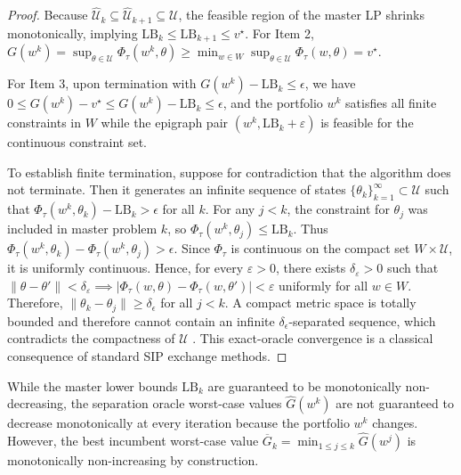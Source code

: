 \documentclass[smallcondensed]{svjour3}
\begin{document}
\begin{proof}
Because $\widehat{\mathcal{U}}_k \subseteq \widehat{\mathcal{U}}_{k+1} \subseteq \mathcal{U}$, the feasible region of the master LP shrinks monotonically, implying $\mathrm{LB}_k \le \mathrm{LB}_{k+1} \le v^\star$. For Item 2, $G(w^k) = \sup_{\theta \in \mathcal{U}} \Phi_\tau(w^k, \theta) \ge \min_{w \in W} \sup_{\theta \in \mathcal{U}} \Phi_\tau(w, \theta) = v^\star$.

For Item 3, upon termination with $G(w^k) - \mathrm{LB}_k \le \epsilon$, we have $0 \le G(w^k) - v^\star \le G(w^k) - \mathrm{LB}_k \le \epsilon$, and the portfolio $w^k$ satisfies all finite constraints in $W$ while the epigraph pair $(w^k, \mathrm{LB}_k+\varepsilon)$ is feasible for the continuous constraint set.

To establish finite termination, suppose for contradiction that the algorithm does not terminate. Then it generates an infinite sequence of states $\{\theta_k\}_{k=1}^\infty \subset \mathcal{U}$ such that $\Phi_\tau(w^k, \theta_k) - \mathrm{LB}_k > \epsilon$ for all $k$. For any $j < k$, the constraint for $\theta_j$ was included in master problem $k$, so $\Phi_\tau(w^k, \theta_j) \le \mathrm{LB}_k$. Thus $\Phi_\tau(w^k, \theta_k) - \Phi_\tau(w^k, \theta_j) > \epsilon$. Since $\Phi_\tau$ is continuous on the compact set $W\times \mathcal{U}$, it is uniformly continuous. Hence, for every $\varepsilon>0$, there exists $\delta_\varepsilon>0$ such that $\|\theta-\theta'\|<\delta_\varepsilon \implies |\Phi_\tau(w,\theta)-\Phi_\tau(w,\theta')|<\varepsilon$ uniformly for all $w\in W$. Therefore, $\|\theta_k - \theta_j\| \ge \delta_\epsilon$ for all $j < k$. A compact metric space is totally bounded and therefore cannot contain an infinite $\delta_\epsilon$-separated sequence, which contradicts the compactness of $\mathcal{U}$ \cite{hettich1993semi, lopez2007semi}. This exact-oracle convergence is a classical consequence of standard SIP exchange methods.
\end{proof}


\begin{remark}
While the master lower bounds $\mathrm{LB}_k$ are guaranteed to be monotonically non-decreasing, the separation oracle worst-case values $\widehat{G}(w^k)$ are not guaranteed to decrease monotonically at every iteration because the portfolio $w^k$ changes. However, the best incumbent worst-case value $\overline{G}_k = \min_{1 \le j \le k} \widehat{G}(w^j)$ is monotonically non-increasing by construction.
\end{remark}
\end{document}
